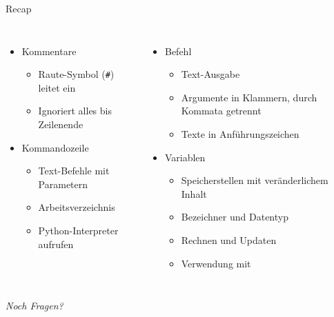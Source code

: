 
\begin{frame}[t,plain]
\titlepage
\end{frame}


\begin{frame}{Recap}
%
\begin{columns}[T]
\begin{itemize}
\item Kommentare
	\begin{itemize}
	\item Raute-Symbol (\texttt{\#}) leitet ein 
	\item Ignoriert alles bis Zeilenende
	\end{itemize}
\item Kommandozeile
	\begin{itemize}
	\item Text-Befehle mit Parametern
	\item Arbeitsverzeichnis
	\item Python-Interpreter aufrufen
	\end{itemize}
\end{itemize}
%
\begin{itemize}
\item Befehl 
	\begin{itemize}
	\item Text-Ausgabe
	\item Argumente in Klammern, durch Kommata getrennt
	\item Texte in Anführungszeichen
	\end{itemize}
\item Variablen
	\begin{itemize}
	\item Speicherstellen mit veränderlichem Inhalt
	\item Bezeichner und Datentyp
	\item Rechnen und Updaten
	\item Verwendung mit 
	\end{itemize}
\end{itemize}
\end{columns}
%
\begin{center}
	\emph{Noch Fragen?}
\end{center}
%
\end{frame}

